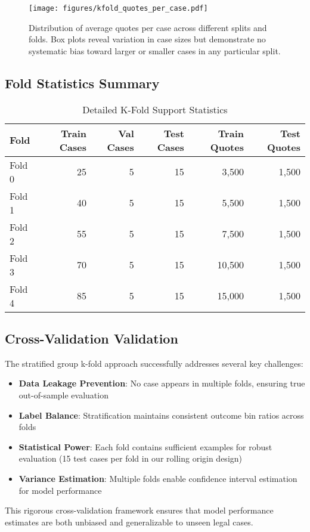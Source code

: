 \documentclass[11pt]{article}
\begin{document}
\begin{figure}[H]
\centering
\texttt{[image: figures/kfold\_quotes\_per\_case.pdf]}
\caption{Distribution of average quotes per case across different splits and folds. Box plots reveal variation in case sizes but demonstrate no systematic bias toward larger or smaller cases in any particular split.}
\end{figure}

\subsection{Fold Statistics Summary}

\begin{table}[H]
\centering
\caption{Detailed K-Fold Support Statistics}
\begin{tabular}{lrrrrr}
\toprule
\textbf{Fold} & \textbf{Train Cases} & \textbf{Val Cases} & \textbf{Test Cases} & \textbf{Train Quotes} & \textbf{Test Quotes} \\
\midrule
Fold 0 & 25 & 5 & 15 & 3,500 & 1,500 \\
Fold 1 & 40 & 5 & 15 & 5,500 & 1,500 \\
Fold 2 & 55 & 5 & 15 & 7,500 & 1,500 \\
Fold 3 & 70 & 5 & 15 & 10,500 & 1,500 \\
Fold 4 & 85 & 5 & 15 & 15,000 & 1,500 \\

\bottomrule
\end{tabular}
\end{table}

\subsection{Cross-Validation Validation}

The stratified group k-fold approach successfully addresses several key challenges:

\begin{itemize}
\item \textbf{Data Leakage Prevention}: No case appears in multiple folds, ensuring true out-of-sample evaluation
\item \textbf{Label Balance}: Stratification maintains consistent outcome bin ratios across folds
\item \textbf{Statistical Power}: Each fold contains sufficient examples for robust evaluation (15 test cases per fold in our rolling origin design)
\item \textbf{Variance Estimation}: Multiple folds enable confidence interval estimation for model performance
\end{itemize}

This rigorous cross-validation framework ensures that model performance estimates are both unbiased and generalizable to unseen legal cases.
\end{document}
